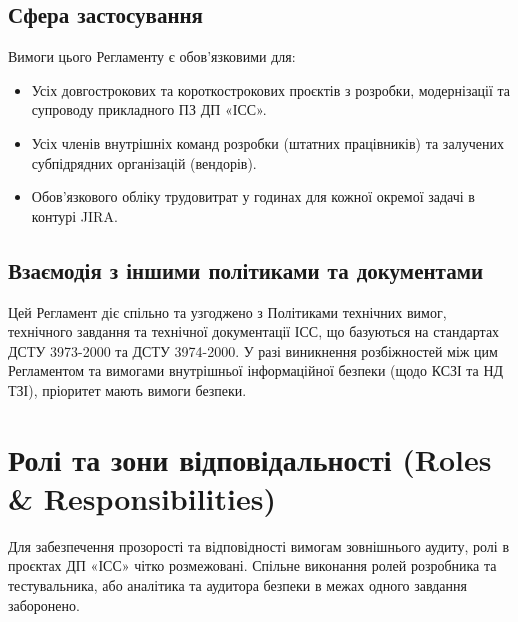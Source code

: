 \documentclass{article}
\begin{document}
\subsection{Сфера застосування}
Вимоги цього Регламенту є обов'язковими для:
\begin{itemize}
    \item Усіх довгострокових та короткострокових проєктів з розробки, модернізації та супроводу прикладного ПЗ ДП «ІСС».
    \item Усіх членів внутрішніх команд розробки (штатних працівників) та залучених субпідрядних організацій (вендорів).
    \item Обов'язкового обліку трудовитрат у годинах для кожної окремої задачі в контурі JIRA.
\end{itemize}

\subsection{Взаємодія з іншими політиками та документами}
Цей Регламент діє спільно та узгоджено з Політиками технічних вимог, технічного завдання та технічної документації ІСС, що базуються на стандартах ДСТУ 3973-2000 та ДСТУ 3974-2000. У разі виникнення розбіжностей між цим Регламентом та вимогами внутрішньої інформаційної безпеки (щодо КСЗІ та НД ТЗІ), пріоритет мають вимоги безпеки.

\section{Ролі та зони відповідальності (Roles \& Responsibilities)}

Для забезпечення прозорості та відповідності вимогам зовнішнього аудиту, ролі в проєктах ДП «ІСС» чітко розмежовані. Спільне виконання ролей розробника та тестувальника, або аналітика та аудитора безпеки в межах одного завдання заборонено.
\end{document}
